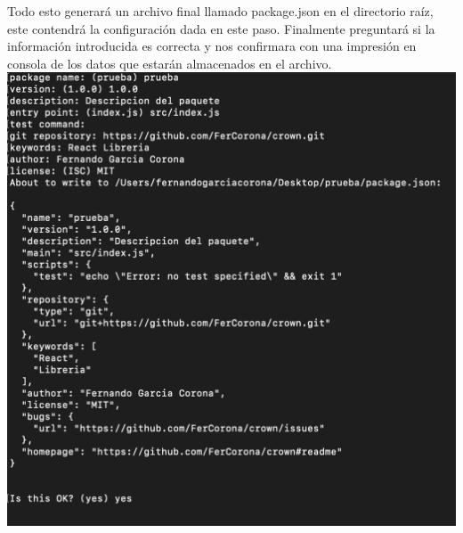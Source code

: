 Todo esto generará un archivo final llamado package.json en el directorio raíz, este contendrá la configuración dada en este paso.
Finalmente preguntará si la información introducida es correcta  y nos confirmara con una impresión en consola de los datos que estarán almacenados en el archivo.
\newline
\newline
\includegraphics[width=1\textwidth]{./Imagenes/image9.png}
\newline
\newline

